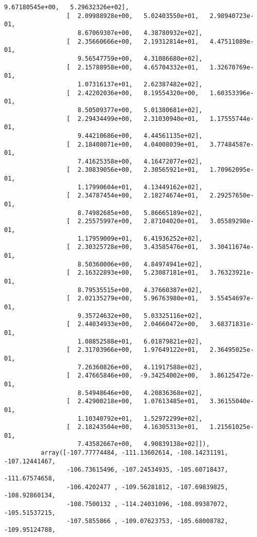 \documentclass[11pt]{article}
\begin{document}
\begin{Verbatim}[commandchars=\\\{\}]
                    9.67180545e+00,   5.29632326e+02],
                 [  2.09988928e+00,   5.02403550e+01,   2.98940723e-01,
                    8.67069307e+00,   4.38780932e+02],
                 [  2.35660666e+00,   2.19312814e+01,   4.47511089e-01,
                    9.56547759e+00,   4.31086680e+02],
                 [  2.15788958e+00,   4.65704332e+01,   1.32670769e-01,
                    1.07316137e+01,   2.62387482e+02],
                 [  2.42202036e+00,   8.19554320e+00,   1.60353396e-01,
                    8.50509377e+00,   5.01380681e+02],
                 [  2.29434499e+00,   2.31030940e+01,   1.17555744e-01,
                    9.44210686e+00,   4.44561135e+02],
                 [  2.18408071e+00,   4.04008039e+01,   3.77484587e-01,
                    7.41625358e+00,   4.16472077e+02],
                 [  2.30839056e+00,   2.30565921e+01,   1.70962095e-01,
                    1.17990604e+01,   4.13449162e+02],
                 [  2.34787454e+00,   2.18274674e+01,   2.29257650e-01,
                    8.74982685e+00,   5.86665189e+02],
                 [  2.25575997e+00,   2.87104020e+01,   3.05589298e-01,
                    1.17959009e+01,   6.41936252e+02],
                 [  2.30325728e+00,   3.43585476e+01,   3.30411674e-01,
                    8.50360006e+00,   4.84974941e+02],
                 [  2.16322893e+00,   5.23087181e+01,   3.76323921e-01,
                    8.79535515e+00,   4.37660387e+02],
                 [  2.02135279e+00,   5.96763980e+01,   3.55454697e-01,
                    9.35724632e+00,   5.03325116e+02],
                 [  2.44034933e+00,   2.04660472e+00,   3.68371831e-01,
                    1.08852588e+01,   6.01879821e+02],
                 [  2.31703966e+00,   1.97649122e+01,   2.36495025e-01,
                    7.26360826e+00,   4.11917588e+02],
                 [  2.47665846e+00,  -9.34254002e+00,   3.86125472e-01,
                    8.54948646e+00,   4.20836368e+02],
                 [  2.42900218e+00,   1.07613485e+01,   3.36155040e-01,
                    1.10340792e+01,   1.52972299e+02],
                 [  2.18243504e+00,   4.16305313e+01,   1.21561025e-01,
                    7.43582667e+00,   4.90839138e+02]]),
          array([-107.77774484, -111.13602614, -108.14231191, -107.12441467,
                 -106.73615496, -107.24534935, -105.60718437, -111.67574658,
                 -106.4202477 , -109.56281812, -107.69839825, -108.92860134,
                 -108.7500132 , -114.24031096, -108.09387072, -105.51537215,
                 -107.5855866 , -109.07623753, -105.68008782, -109.95124788,

\end{Verbatim}
\end{document}
